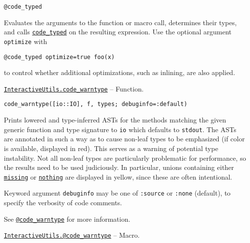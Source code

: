 \begin{adjustwidth}{2em}{0pt}


\begin{verbatim}
@code_typed
\end{verbatim}

Evaluates the arguments to the function or macro call, determines their types, and calls \hyperlink{14801595959157535515}{\texttt{code\_typed}} on the resulting expression. Use the optional argument \texttt{optimize} with


\begin{lstlisting}
@code_typed optimize=true foo(x)
\end{lstlisting}

to control whether additional optimizations, such as inlining, are also applied.



\end{adjustwidth}
\hypertarget{5565852192659724503}{} 
\hyperlink{5565852192659724503}{\texttt{InteractiveUtils.code\_warntype}}  -- {Function.}

\begin{adjustwidth}{2em}{0pt}


\begin{verbatim}
code_warntype([io::IO], f, types; debuginfo=:default)
\end{verbatim}

Prints lowered and type-inferred ASTs for the methods matching the given generic function and type signature to \texttt{io} which defaults to \texttt{stdout}. The ASTs are annotated in such a way as to cause {\textquotedbl}non-leaf{\textquotedbl} types to be emphasized (if color is available, displayed in red). This serves as a warning of potential type instability. Not all non-leaf types are particularly problematic for performance, so the results need to be used judiciously. In particular, unions containing either \hyperlink{14596725676261444434}{\texttt{missing}} or \hyperlink{9331422207248206047}{\texttt{nothing}} are displayed in yellow, since these are often intentional.

Keyword argument \texttt{debuginfo} may be one of \texttt{:source} or \texttt{:none} (default), to specify the verbosity of code comments.

See \hyperlink{7310642359836438564}{\texttt{@code\_warntype}} for more information.



\end{adjustwidth}
\hypertarget{8092893264277772840}{} 
\hyperlink{8092893264277772840}{\texttt{InteractiveUtils.@code\_warntype}}  -- {Macro.}

